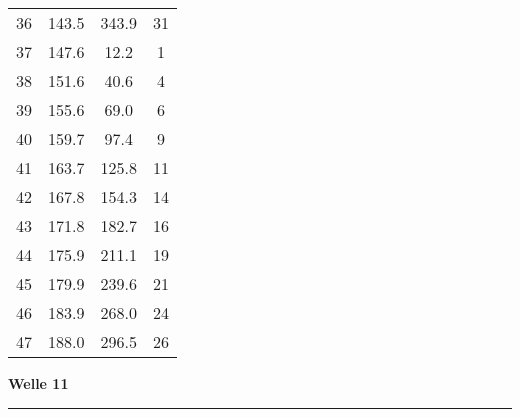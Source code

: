 \documentclass[10pt, a4paper]{article}
\begin{document}
\begin{center}
\begin{tabular}{c|c|c|c}
		36 & 143.5 & 343.9 & 31 \\
		37 & 147.6 & 12.2 & 1 \\
		38 & 151.6 & 40.6 & 4 \\
		39 & 155.6 & 69.0 & 6 \\
		40 & 159.7 & 97.4 & 9 \\
		41 & 163.7 & 125.8 & 11 \\
		42 & 167.8 & 154.3 & 14 \\
		43 & 171.8 & 182.7 & 16 \\
		44 & 175.9 & 211.1 & 19 \\
		45 & 179.9 & 239.6 & 21 \\
		46 & 183.9 & 268.0 & 24 \\
		47 & 188.0 & 296.5 & 26 \\
	\end{tabular}
\end{center}
\newpage
\centerline{{\bf Welle 11} }
\rule{1.0\textwidth}{0.5mm}
\end{document}
